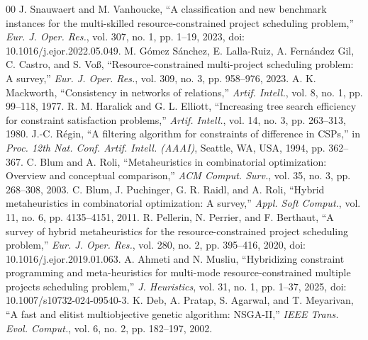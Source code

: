 \documentclass{IEEEtran}
\begin{document}
\begin{thebibliography}{00}
 J. Snauwaert and M. Vanhoucke, ``A classification and new benchmark instances for the multi-skilled resource-constrained project scheduling problem,'' \textit{Eur. J. Oper. Res.}, vol. 307, no. 1, pp. 1--19, 2023, doi: 10.1016/j.ejor.2022.05.049.
 M. Gómez Sánchez, E. Lalla-Ruiz, A. Fernández Gil, C. Castro, and S. Voß, ``Resource-constrained multi-project scheduling problem: A survey,'' \textit{Eur. J. Oper. Res.}, vol. 309, no. 3, pp. 958--976, 2023.
 A. K. Mackworth, ``Consistency in networks of relations,'' \textit{Artif. Intell.}, vol. 8, no. 1, pp. 99--118, 1977.
 R. M. Haralick and G. L. Elliott, ``Increasing tree search efficiency for constraint satisfaction problems,'' \textit{Artif. Intell.}, vol. 14, no. 3, pp. 263--313, 1980.
 J.-C. Régin, ``A filtering algorithm for constraints of difference in CSPs,'' in \textit{Proc. 12th Nat. Conf. Artif. Intell. (AAAI)}, Seattle, WA, USA, 1994, pp. 362--367.
 C. Blum and A. Roli, ``Metaheuristics in combinatorial optimization: Overview and conceptual comparison,'' \textit{ACM Comput. Surv.}, vol. 35, no. 3, pp. 268--308, 2003.
 C. Blum, J. Puchinger, G. R. Raidl, and A. Roli, ``Hybrid metaheuristics in combinatorial optimization: A survey,'' \textit{Appl. Soft Comput.}, vol. 11, no. 6, pp. 4135--4151, 2011.
 R. Pellerin, N. Perrier, and F. Berthaut, ``A survey of hybrid metaheuristics for the resource-constrained project scheduling problem,'' \textit{Eur. J. Oper. Res.}, vol. 280, no. 2, pp. 395--416, 2020, doi: 10.1016/j.ejor.2019.01.063.
 A. Ahmeti and N. Musliu, ``Hybridizing constraint programming and meta-heuristics for multi-mode resource-constrained multiple projects scheduling problem,'' \textit{J. Heuristics}, vol. 31, no. 1, pp. 1--37, 2025, doi: 10.1007/s10732-024-09540-3.
 K. Deb, A. Pratap, S. Agarwal, and T. Meyarivan, ``A fast and elitist multiobjective genetic algorithm: NSGA-II,'' \textit{IEEE Trans. Evol. Comput.}, vol. 6, no. 2, pp. 182--197, 2002.
\end{thebibliography}
\end{document}
